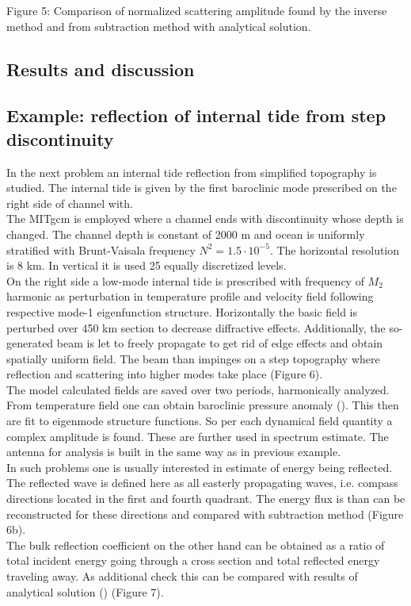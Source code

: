 Figure 5: Comparison of normalized scattering amplitude found by the inverse method and from 
subtraction method with analytical solution.

\subsection{Results and discussion}

\subsection{Example: reflection of internal tide from step discontinuity}
In the next problem an internal tide reflection from simplified topography is studied. The internal 
tide is given by the first baroclinic mode prescribed on the right side of channel with.\\
The MITgcm is employed where a channel ends with discontinuity whose depth is changed. The channel 
depth is constant of 2000 m and ocean is uniformly stratified with Brunt-Vaisala frequency $ N^2 = 
1.5 \cdot 10^{-5} $. The horizontal resolution is 8 km. In vertical it is used 25 equally 
discretized levels.\\
On the right side a low-mode internal tide is prescribed with frequency of $ M_2 $ harmonic as 
perturbation in temperature profile and velocity field following respective mode-1 eigenfunction 
structure. Horizontally the basic field is perturbed over 450 km section to decrease diffractive 
effects. Additionally, the so-generated beam is let to freely propagate to get rid of edge effects 
and obtain spatially uniform field. The beam than impinges on a step topography where reflection  
and scattering into higher modes take place (Figure 6).\\
The model calculated fields are saved over two periods, harmonically analyzed. From temperature 
field one can obtain baroclinic pressure anomaly (\cite{Kelly2010}). This then are fit to eigenmode 
structure functions. So per each dynamical field quantity a complex amplitude is found. These are 
further used in spectrum estimate. The antenna for analysis is built in the same way as in previous 
example.\\
In such problems one is usually interested in estimate of energy being reflected. The reflected 
wave is defined here as all easterly propagating waves, i.e. compass directions located in the 
first and fourth quadrant. The energy flux is than can be reconstructed for these directions and 
compared with subtraction method (Figure 6b).\\
The bulk reflection coefficient on the other hand can be obtained as a ratio of total incident 
energy going through a cross section and total reflected energy traveling away. As additional check 
this can be compared with results of analytical solution (\cite{chapman1981scattering}) (Figure 
7).\\

